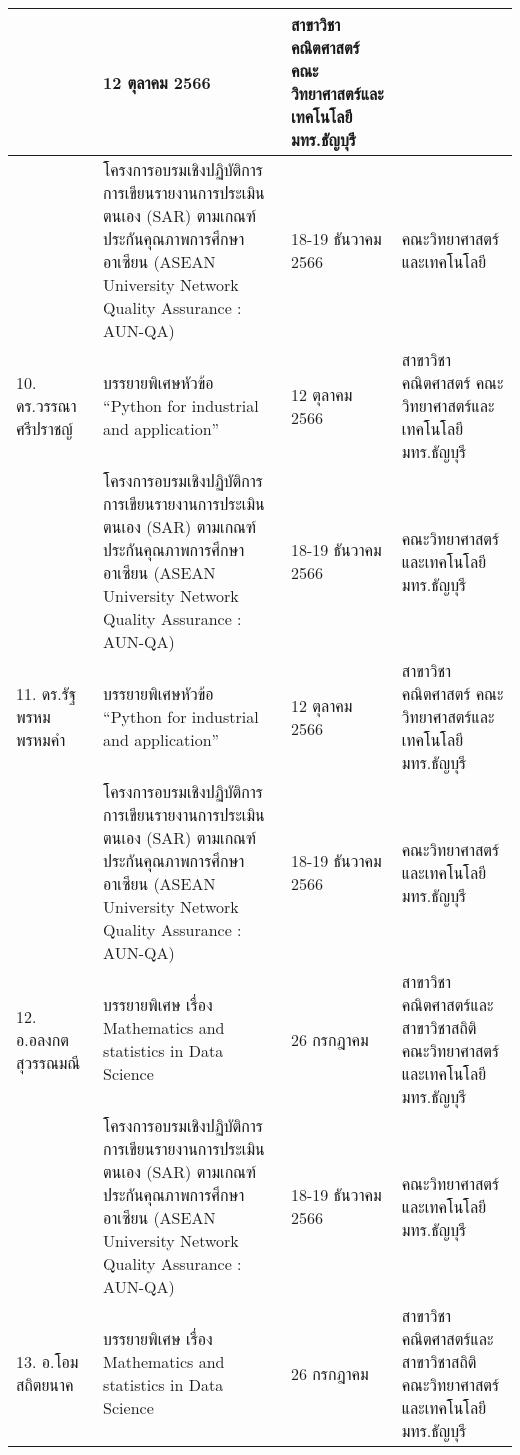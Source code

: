 \begin{longtable}{|p{}|>{\raggedright}p{}|>{\raggedright}p{}|p{}|}
&12 ตุลาคม 2566	
&สาขาวิชาคณิตศาสตร์ คณะวิทยาศาสตร์และเทคโนโลยี มทร.ธัญบุรี\\ 
\hline
&โครงการอบรมเชิงปฏิบัติการ\newline การเขียนรายงานการประเมินตนเอง (SAR) ตามเกณฑ์ประกันคุณภาพการศึกษาอาเซียน (ASEAN University Network Quality Assurance : AUN-QA)
&18-19 ธันวาคม 2566	
&คณะวิทยาศาสตร์และเทคโนโลยี\\ 
\hline
10. ดร.วรรณา ศรีปราชญ์
&บรรยายพิเศษหัวข้อ “Python for industrial and application”	
&12 ตุลาคม 2566	
&สาขาวิชาคณิตศาสตร์ คณะวิทยาศาสตร์และเทคโนโลยี มทร.ธัญบุรี\\ 
\cline{2-4}
&โครงการอบรมเชิงปฏิบัติการ\newline การเขียนรายงานการประเมินตนเอง (SAR) ตามเกณฑ์ประกันคุณภาพการศึกษาอาเซียน (ASEAN University Network Quality Assurance : AUN-QA)
&18-19 ธันวาคม 2566	
&คณะวิทยาศาสตร์และเทคโนโลยี มทร.ธัญบุรี\\
\hline
11. ดร.รัฐพรหม พรหมคำ	&บรรยายพิเศษหัวข้อ “Python for industrial and application”	
&12 ตุลาคม 2566	
&สาขาวิชาคณิตศาสตร์ คณะวิทยาศาสตร์และเทคโนโลยี มทร.ธัญบุรี\\ 
\cline{2-4}
&โครงการอบรมเชิงปฏิบัติการ\newline การเขียนรายงานการประเมินตนเอง (SAR) ตามเกณฑ์ประกันคุณภาพการศึกษาอาเซียน (ASEAN University Network Quality Assurance : AUN-QA)
&18-19 ธันวาคม 2566	
&คณะวิทยาศาสตร์และเทคโนโลยี มทร.ธัญบุรี\\
\hline
12. อ.อลงกต สุวรรณมณี
&บรรยายพิเศษ เรื่อง Mathematics and statistics in Data Science
& 26 กรกฎาคม\newline 2566                  
&สาขาวิชาคณิตศาสตร์และสาขาวิชาสถิติ\newline คณะวิทยาศาสตร์และเทคโนโลยี มทร.ธัญบุรี\\
\cline{2-4} 
&โครงการอบรมเชิงปฏิบัติการ\newline การเขียนรายงานการประเมินตนเอง (SAR) ตามเกณฑ์ประกันคุณภาพการศึกษาอาเซียน (ASEAN University Network Quality Assurance : AUN-QA)
&18-19 ธันวาคม 2566	
&คณะวิทยาศาสตร์และเทคโนโลยี มทร.ธัญบุรี\\
\hline
13. อ.โอม สถิตยนาค
&บรรยายพิเศษ เรื่อง Mathematics and statistics in Data Science
& 26 กรกฎาคม\newline 2566                  
&สาขาวิชาคณิตศาสตร์และสาขาวิชาสถิติ\newline คณะวิทยาศาสตร์และเทคโนโลยี มทร.ธัญบุรี\\

\end{longtable}
